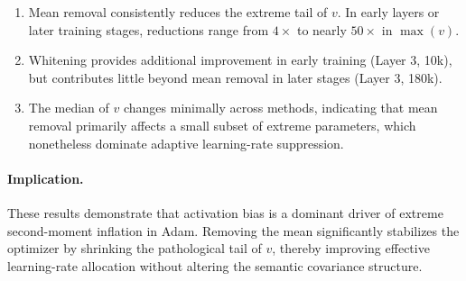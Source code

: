 \begin{enumerate}
\item Mean removal consistently reduces the extreme tail of $v$.
In early layers or later training stages, reductions range from
$4\times$ to nearly $50\times$ in $\max(v)$.

\item Whitening provides additional improvement in early training
(Layer 3, 10k), but contributes little beyond mean removal
in later stages (Layer 3, 180k).

\item The median of $v$ changes minimally across methods,
indicating that mean removal primarily affects a small subset
of extreme parameters, which nonetheless dominate adaptive
learning-rate suppression.
\end{enumerate}

\paragraph{Implication.}
These results demonstrate that activation bias is a dominant driver of
extreme second-moment inflation in Adam.
Removing the mean significantly stabilizes the optimizer by shrinking
the pathological tail of $v$, thereby improving effective learning-rate
allocation without altering the semantic covariance structure.